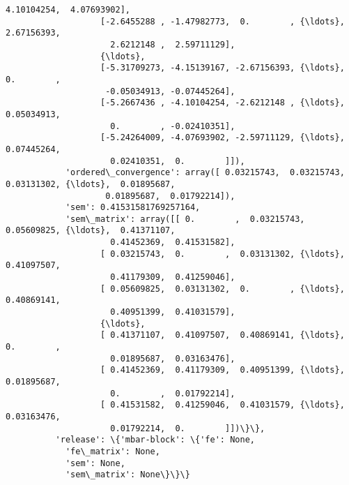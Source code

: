 \documentclass[11pt]{article}
\begin{document}
\begin{Verbatim}[commandchars=\\\{\}]
                     4.10104254,  4.07693902],
                   [-2.6455288 , -1.47982773,  0.        , {\ldots},  2.67156393,
                     2.6212148 ,  2.59711129],
                   {\ldots}, 
                   [-5.31709273, -4.15139167, -2.67156393, {\ldots},  0.        ,
                    -0.05034913, -0.07445264],
                   [-5.2667436 , -4.10104254, -2.6212148 , {\ldots},  0.05034913,
                     0.        , -0.02410351],
                   [-5.24264009, -4.07693902, -2.59711129, {\ldots},  0.07445264,
                     0.02410351,  0.        ]]),
            'ordered\_convergence': array([ 0.03215743,  0.03215743,  0.03131302, {\ldots},  0.01895687,
                    0.01895687,  0.01792214]),
            'sem': 0.41531581769257164,
            'sem\_matrix': array([[ 0.        ,  0.03215743,  0.05609825, {\ldots},  0.41371107,
                     0.41452369,  0.41531582],
                   [ 0.03215743,  0.        ,  0.03131302, {\ldots},  0.41097507,
                     0.41179309,  0.41259046],
                   [ 0.05609825,  0.03131302,  0.        , {\ldots},  0.40869141,
                     0.40951399,  0.41031579],
                   {\ldots}, 
                   [ 0.41371107,  0.41097507,  0.40869141, {\ldots},  0.        ,
                     0.01895687,  0.03163476],
                   [ 0.41452369,  0.41179309,  0.40951399, {\ldots},  0.01895687,
                     0.        ,  0.01792214],
                   [ 0.41531582,  0.41259046,  0.41031579, {\ldots},  0.03163476,
                     0.01792214,  0.        ]])\}\},
          'release': \{'mbar-block': \{'fe': None,
            'fe\_matrix': None,
            'sem': None,
            'sem\_matrix': None\}\}\}
\end{Verbatim}
            

    
    
    
    
\end{document}
